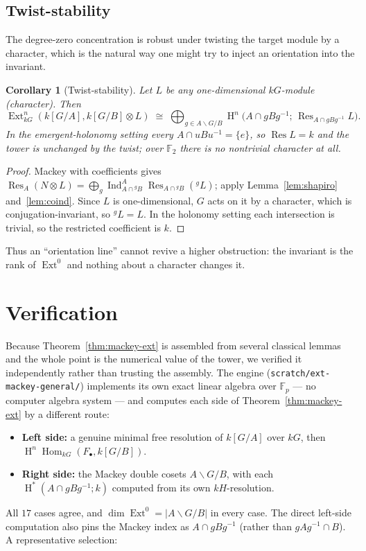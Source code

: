\documentclass[11pt]{amsart}
\theoremstyle{plain}
\newtheorem{corollary}[theorem]{Corollary}
\theoremstyle{definition}
\DeclareMathOperator{\Ind}{Ind}
\DeclareMathOperator{\Res}{Res}
\DeclareMathOperator{\Hom}{Hom}
\DeclareMathOperator{\Ext}{Ext}
\DeclareMathOperator{\Hh}{H}
\newcommand{\conj}[2]{{}^{#1}\!#2}
\newcommand{\dcoset}[3]{#1\backslash #2/#3}
\begin{document}
\subsection{Twist-stability}
The degree-zero concentration is robust under twisting the target module by a character,
which is the natural way one might try to inject an orientation into the invariant.

\begin{corollary}[Twist-stability]\label{cor:twist}
Let $L$ be any one-dimensional $kG$-module (character). Then
\[
   \Ext^n_{kG}(k[G/A],k[G/B]\otimes L)\;\cong\;
   \bigoplus_{g\in\dcoset{A}{G}{B}}\Hh^n\!\bigl(A\cap gBg^{-1};\,\Res_{A\cap gBg^{-1}}L\bigr).
\]
In the emergent-holonomy setting every $A\cap uBu^{-1}=\{e\}$, so $\Res L=k$ and the tower
is unchanged by the twist; over $\mathbb{F}_2$ there is no nontrivial character at all.
\end{corollary}
\begin{proof}
Mackey with coefficients gives $\Res_A(N\otimes L)=\bigoplus_g\Ind_{A\cap\conj{g}{B}}^A
\Res_{A\cap\conj{g}{B}}(\conj{g}{L})$; apply Lemma~\ref{lem:shapiro} and~\ref{lem:coind}.
Since $L$ is one-dimensional, $G$ acts on it by a character, which is conjugation-invariant,
so $\conj{g}{L}=L$. In the holonomy setting each intersection is trivial, so the restricted
coefficient is $k$.
\end{proof}

Thus an ``orientation line'' cannot revive a higher obstruction: the invariant is the rank
of $\Ext^0$ and nothing about a character changes it.

\section{Verification}\label{sec:verify}

Because Theorem~\ref{thm:mackey-ext} is assembled from several classical lemmas and the
whole point is the numerical value of the tower, we verified it independently rather than
trusting the assembly. The engine (\texttt{scratch/ext-mackey-general/}) implements its own
exact linear algebra over $\mathbb{F}_p$ --- no computer algebra system --- and computes
each side of Theorem~\ref{thm:mackey-ext} by a different route:
\begin{itemize}
\item \textbf{Left side:} a genuine minimal free resolution of $k[G/A]$ over $kG$, then
   $\Hh^n\Hom_{kG}(F_\bullet,k[G/B])$.
\item \textbf{Right side:} the Mackey double cosets $\dcoset{A}{G}{B}$, with each
   $\Hh^*(A\cap gBg^{-1};k)$ computed from its own $kH$-resolution.
\end{itemize}
All $17$ cases agree, and $\dim\Ext^0=\lvert\dcoset{A}{G}{B}\rvert$ in every case. The
direct left-side computation also pins the Mackey index as $A\cap gBg^{-1}$ (rather than
$gAg^{-1}\cap B$). A representative selection:
\end{document}
